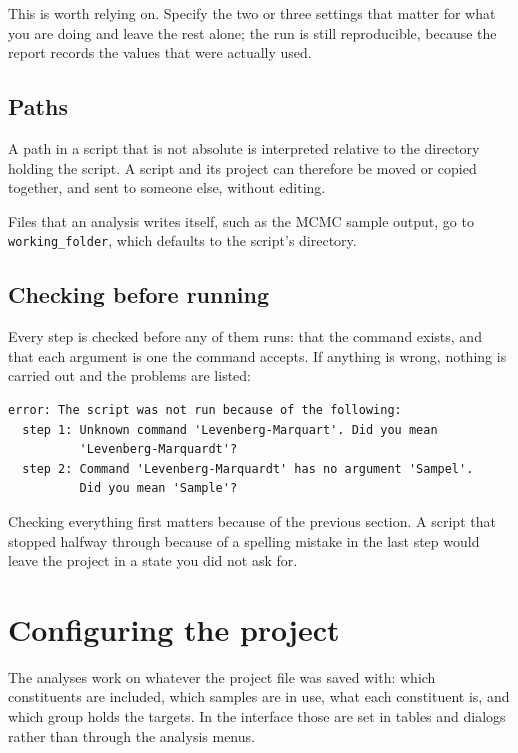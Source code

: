 \documentclass[11pt,a4paper]{report}
\begin{document}
This is worth relying on. Specify the two or three settings that matter for
what you are doing and leave the rest alone; the run is still reproducible,
because the report records the values that were actually used.

\section{Paths}

A path in a script that is not absolute is interpreted relative to the
directory holding the script. A script and its project can therefore be moved
or copied together, and sent to someone else, without editing.

Files that an analysis writes itself, such as the MCMC sample output, go to
\texttt{working\_folder}, which defaults to the script's directory.

\section{Checking before running}

Every step is checked before any of them runs: that the command exists, and
that each argument is one the command accepts. If anything is wrong, nothing
is carried out and the problems are listed:

\begin{lstlisting}
error: The script was not run because of the following:
  step 1: Unknown command 'Levenberg-Marquart'. Did you mean
          'Levenberg-Marquardt'?
  step 2: Command 'Levenberg-Marquardt' has no argument 'Sampel'.
          Did you mean 'Sample'?
\end{lstlisting}

Checking everything first matters because of the previous section. A script
that stopped halfway through because of a spelling mistake in the last step
would leave the project in a state you did not ask for.

\chapter{Configuring the project}
\label{ch:setup}

The analyses work on whatever the project file was saved with: which
constituents are included, which samples are in use, what each constituent is,
and which group holds the targets. In the interface those are set in tables and
dialogs rather than through the analysis menus.
\end{document}
